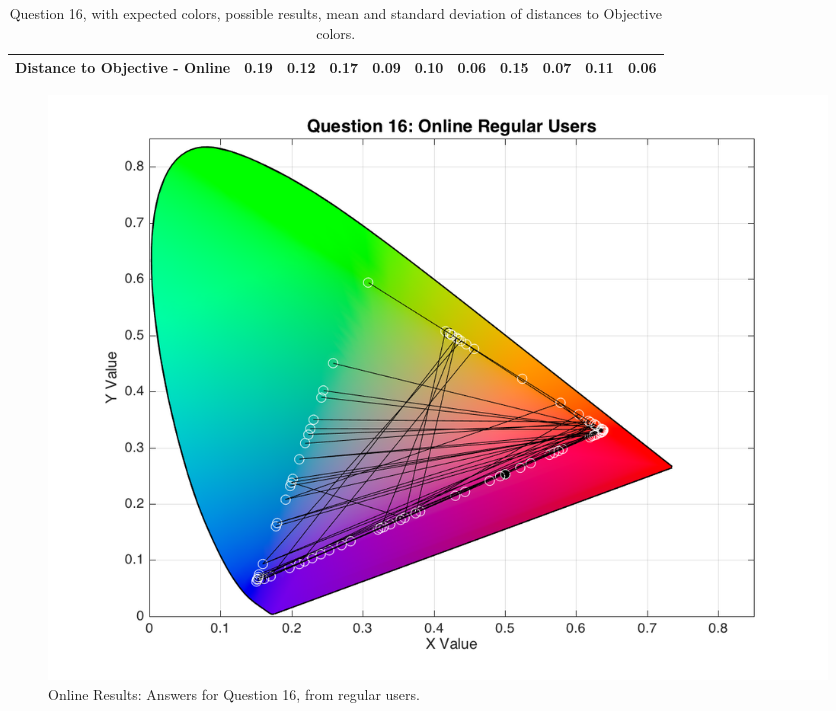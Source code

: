 \begin{table}[H]
{\begin{tabular}{lccccccccccccc}
    \multicolumn{4}{l}{Distance to Objective - Online}                                                                                               & \multicolumn{1}{|c}{0.19}        & \multicolumn{1}{c|}{0.12}    & \multicolumn{1}{|c}{0.17}        & \multicolumn{1}{c|}{0.09}    & \multicolumn{1}{|c}{\textbf{0.10}}       & \multicolumn{1}{c|}{0.06}    & \multicolumn{1}{|c}{0.15}        & \multicolumn{1}{c|}{0.07}    & \multicolumn{1}{|c}{0.11}       & \multicolumn{1}{c|}{0.06}    \\ \hline
    \end{tabular}}
  \caption[Question 16, with expected Results.]{Question 16, with expected colors, possible results, mean and standard deviation of distances to Objective colors.}
  \label{table:lab_q16_expected}
\end{table}
%
\begin{figure}[htbp]
  \centering
  \begin{minipage}{0.48\textwidth}
    \centering
    \includegraphics[width=\textwidth]{images/results/16_online_regularUsers.png}
    \caption[Online Results: Answers for Question 16, from regular users.]{Online Results: Answers for Question 16, from regular users.}
    \label{fig:onlineregular_16}
  \end{minipage}\hfill
  \begin{minipage}{0.48\textwidth}
    \centering

\end{minipage}
\end{figure}
